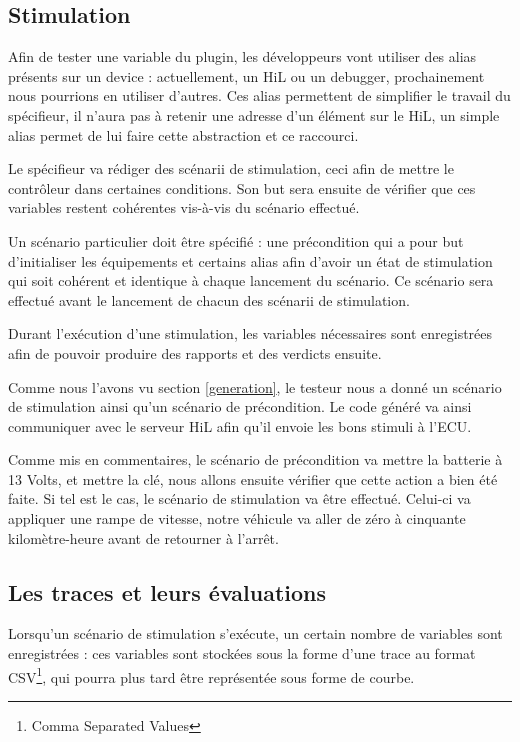 \subsection{Stimulation} \label{stim}
\vspace{-20px}
Afin de tester une variable du plugin, les développeurs vont utiliser des alias présents sur un device : actuellement, un HiL ou un debugger, prochainement nous pourrions en utiliser d'autres. Ces alias permettent de simplifier le travail du spécifieur, il n'aura pas à retenir une adresse d'un élément sur le HiL, un simple alias permet de lui faire cette abstraction et ce raccourci.

Le spécifieur va rédiger des scénarii de stimulation, ceci afin de mettre le contrôleur dans certaines conditions. Son but sera ensuite de vérifier que ces variables restent cohérentes vis-à-vis du scénario effectué. 

Un scénario particulier doit être spécifié : une précondition qui a pour but d'initialiser les équipements et certains alias afin d'avoir un état de stimulation qui soit cohérent et identique à chaque lancement du scénario. Ce scénario sera effectué avant le lancement de chacun des scénarii de stimulation.

Durant l'exécution d'une stimulation, les variables nécessaires sont enregistrées afin de pouvoir produire des rapports et des
verdicts ensuite.
\begin{exemple}
	Comme nous l'avons vu section \ref{generation}, le testeur nous a donné un scénario de stimulation ainsi qu'un scénario de précondition. Le code généré va ainsi communiquer avec le serveur HiL afin qu'il envoie les bons stimuli à l'ECU.

	Comme mis en commentaires, le scénario de précondition va mettre la batterie à 13 Volts, et mettre la clé, nous allons ensuite vérifier que cette action a bien été faite. Si tel est le cas, le scénario de stimulation va être effectué. Celui-ci va appliquer une rampe de vitesse, notre véhicule va aller de zéro à cinquante kilomètre-heure avant de retourner à l'arrêt.	
\end{exemple}

\subsection{Les traces et leurs évaluations}\label{expectedBehavior}
Lorsqu'un scénario de stimulation s'exécute, un certain nombre de variables sont enregistrées : ces variables sont stockées sous la forme d'une trace au format CSV\footnote{Comma Separated Values}, qui pourra plus tard être représentée sous forme de courbe. 

